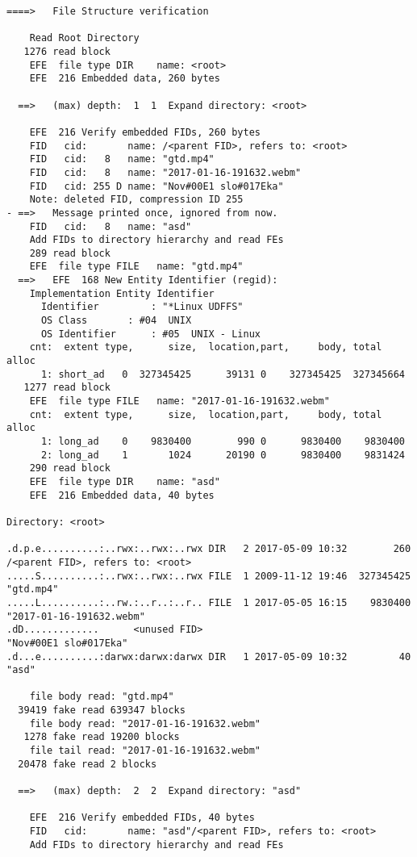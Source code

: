 \begin{lstlisting}
====>   File Structure verification

    Read Root Directory
   1276 read block
    EFE  file type DIR    name: <root>
    EFE  216 Embedded data, 260 bytes

  ==>   (max) depth:  1  1  Expand directory: <root>

    EFE  216 Verify embedded FIDs, 260 bytes
    FID   cid:       name: /<parent FID>, refers to: <root>
    FID   cid:   8   name: "gtd.mp4"
    FID   cid:   8   name: "2017-01-16-191632.webm"
    FID   cid: 255 D name: "Nov#00E1 slo#017Eka"
    Note: deleted FID, compression ID 255
- ==>   Message printed once, ignored from now.
    FID   cid:   8   name: "asd"
    Add FIDs to directory hierarchy and read FEs
    289 read block
    EFE  file type FILE   name: "gtd.mp4"
  ==>   EFE  168 New Entity Identifier (regid):
    Implementation Entity Identifier
      Identifier         : "*Linux UDFFS"
      OS Class       : #04  UNIX
      OS Identifier      : #05  UNIX - Linux
    cnt:  extent type,      size,  location,part,     body, total alloc
      1: short_ad   0  327345425      39131 0    327345425  327345664
   1277 read block
    EFE  file type FILE   name: "2017-01-16-191632.webm"
    cnt:  extent type,      size,  location,part,     body, total alloc
      1: long_ad    0    9830400        990 0      9830400    9830400
      2: long_ad    1       1024      20190 0      9830400    9831424
    290 read block
    EFE  file type DIR    name: "asd"
    EFE  216 Embedded data, 40 bytes

Directory: <root>

.d.p.e..........:..rwx:..rwx:..rwx DIR   2 2017-05-09 10:32        260 /<parent FID>, refers to: <root>
.....S..........:..rwx:..rwx:..rwx FILE  1 2009-11-12 19:46  327345425 "gtd.mp4"
.....L..........:..rw.:..r..:..r.. FILE  1 2017-05-05 16:15    9830400 "2017-01-16-191632.webm"
.dD.............      <unused FID>                                     "Nov#00E1 slo#017Eka"
.d...e..........:darwx:darwx:darwx DIR   1 2017-05-09 10:32         40 "asd"

    file body read: "gtd.mp4"
  39419 fake read 639347 blocks
    file body read: "2017-01-16-191632.webm"
   1278 fake read 19200 blocks
    file tail read: "2017-01-16-191632.webm"
  20478 fake read 2 blocks

  ==>   (max) depth:  2  2  Expand directory: "asd"

    EFE  216 Verify embedded FIDs, 40 bytes
    FID   cid:       name: "asd"/<parent FID>, refers to: <root>
    Add FIDs to directory hierarchy and read FEs


\end{lstlisting}
